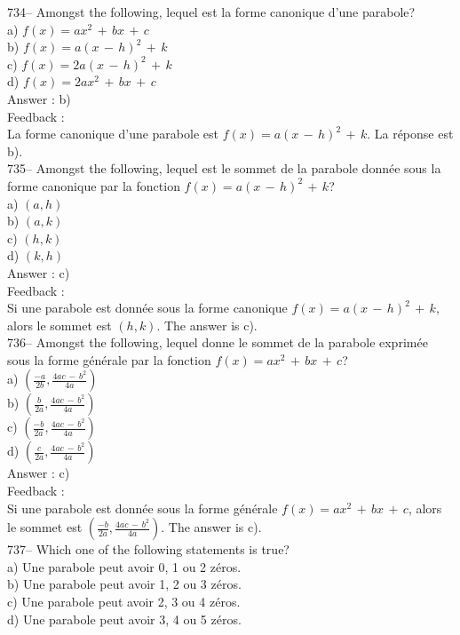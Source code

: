 \documentclass[letterpaper, 12pt]{article}
\begin{document}
734-- Amongst the following, lequel est la forme canonique d'une
parabole?\\
a) $f(x)=ax^{2}\,+\,bx\,+\,c$\\
b) $f(x)=a(x\,-\,h)^{2}\,+\,k$\\
c) $f(x)=2a(x\,-\,h)^{2}\,+\,k$\\
d) $f(x)=2ax^{2}\,+\,bx\,+\,c$\\

Answer : b)\\

Feedback : \\
La forme canonique d'une parabole est $f(x)=a(x\,-\,h)^{2}\,+\,k$.  La
r\'eponse est b).\\

735-- Amongst the following, lequel est le sommet de la parabole
donn\'ee sous la forme canonique par la fonction
$f(x)=a(x\,-\,h)^{2}\,+\,k$?\\
a) $(a,h)$\\
b) $(a,k)$\\
c) $(h,k)$\\
d) $(k,h)$\\

Answer : c)\\

Feedback : \\
Si une parabole est donn\'ee sous la forme canonique
$f(x)=a(x\,-\,h)^{2}\,+\,k$, alors le sommet est $(h,k)$.  The answer is
c).\\

736-- Amongst the following, lequel donne le sommet de la parabole
exprim\'ee sous la forme g\'en\'erale par la fonction
$f(x)=ax^{2}\,+\,bx\,+\,c$?\\
a) $(\frac{-a}{2b},\frac{4ac\,-\,b^{2}}{4a})$\\[2mm]
b) $(\frac{b}{2a},\frac{4ac\,-\,b^{2}}{4a})$\\[2mm]
c) $(\frac{-b}{2a},\frac{4ac\,-\,b^{2}}{4a})$\\[2mm]
d) $(\frac{c}{2a},\frac{4ac\,-\,b^{2}}{4a})$\\

Answer : c)\\

Feedback : \\
Si une parabole est donn\'ee sous la forme g\'en\'erale
$f(x)=ax^{2}\,+\,bx\,+\,c$, alors le sommet est
$(\frac{-b}{2a},\frac{4ac\,-\,b^{2}}{4a})$.  The answer is c).\\

737-- Which one of the following statements is true?\\
a) Une parabole peut avoir 0, 1 ou 2 z\'eros.\\
b) Une parabole peut avoir 1, 2 ou 3 z\'eros.\\
c) Une parabole peut avoir 2, 3 ou 4 z\'eros.\\
d) Une parabole peut avoir 3, 4 ou 5 z\'eros.\\
\end{document}
